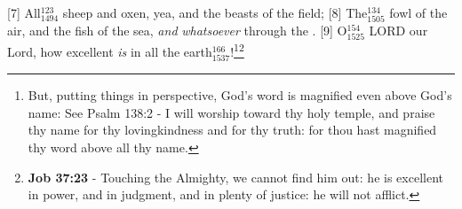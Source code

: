 [7] \textcolor[cmyk]{0.99998,1,0,0}{All\textcolor{jungle}{$_{1494}^{123}$} sheep and oxen, yea, and the beasts of the field;}
[8] \textcolor[cmyk]{0.99998,1,0,0}{The\textcolor{jungle}{$_{1505}^{134}$} fowl of the air, and the fish of the sea, \emph{and} \emph{whatsoever}  through the .}
[9] \textcolor[cmyk]{0.99998,1,0,0}{O\textcolor{jungle}{$_{1525}^{154}$} LORD our Lord, how excellent \emph{is}  in all the earth\textcolor{jungle}{$_{1537}^{166}$}!}\footnote{But, putting things in perspective, God's word is magnified even above God's name: See Psalm 138:2 - I will worship toward thy holy temple, and praise thy name for thy lovingkindness and for thy truth: for thou hast magnified thy word above all thy name.}\footnote{\textbf{Job 37:23} - Touching the Almighty, we cannot find him out: he is excellent in power, and in judgment, and in plenty of justice: he will not afflict.}


